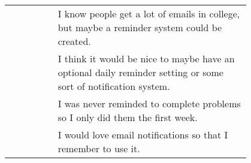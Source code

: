 {\begin{longtable}{R|p{0.8\linewidth}}
		& I know people get a lot of emails in college, but maybe a reminder system could be created.                                                                                                                                                                                                                                                                                                                                                                                                                                                                                                                                                                                                                                                      \\
		& I think it would be nice to maybe have an optional daily reminder setting or some sort of notification system.                                                                                                                                                                                                                                                                                                                                                                                                                                                                                                                                                                                                                                   \\
		& I was never reminded to complete problems so I only did them the first week.                                                                                                                                                                                                                                                                                                                                                                                                                                                                                                                                                                                                                                                                     \\
		& I would love email notifications so that I remember to use it.                                                                                                                                                                                                                                                                                                                                                                                                                                                                                                                                                                                                                                                                                   \\

\end{longtable}}
